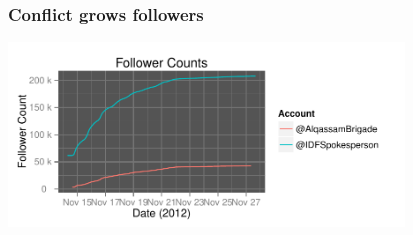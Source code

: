 \documentclass{beamer}
\begin{document}
\begin{frame}\frametitle{Conflict grows followers}
  \begin{center}
    \includegraphics[width=10.5cm]{./imgs/HI_minimal-followers.pdf}
  \end{center}
\end{frame}


%

%
%
%
%
%
\end{document}
